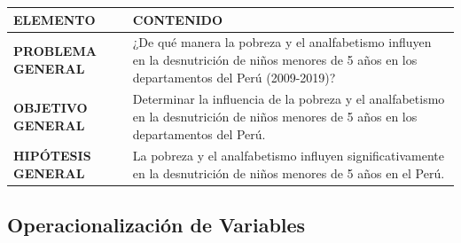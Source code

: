 \documentclass[
  man,
  floatsintext,
  longtable,
  a4paper,
  nolmodern,
  notxfonts,
  notimes,
  12pt,
  colorlinks=true,linkcolor=blue,citecolor=blue,urlcolor=blue]{apa7}
\newcounter{none} %
\begin{document}
{\def\LTcaptype{none} %
\begin{longtable}[]{@{}
  >{\raggedright\arraybackslash}p{}
  >{\raggedright\arraybackslash}p{}@{}}
\toprule\noalign{}
\begin{minipage}[b]{\linewidth}\raggedright
ELEMENTO
\end{minipage} & \begin{minipage}[b]{\linewidth}\raggedright
CONTENIDO
\end{minipage} \\
\midrule\noalign{}
\endhead
\bottomrule\noalign{}
\endlastfoot
\textbf{PROBLEMA GENERAL} & ¿De qué manera la pobreza y el analfabetismo
influyen en la desnutrición de niños menores de 5 años en los
departamentos del Perú (2009-2019)? \\
\textbf{OBJETIVO GENERAL} & Determinar la influencia de la pobreza y el
analfabetismo en la desnutrición de niños menores de 5 años en los
departamentos del Perú. \\
\textbf{HIPÓTESIS GENERAL} & La pobreza y el analfabetismo influyen
significativamente en la desnutrición de niños menores de 5 años en el
Perú. \\
\end{longtable}
}

\subsection{Operacionalización de
Variables}\label{operacionalizaciuxf3n-de-variables}
\end{document}
